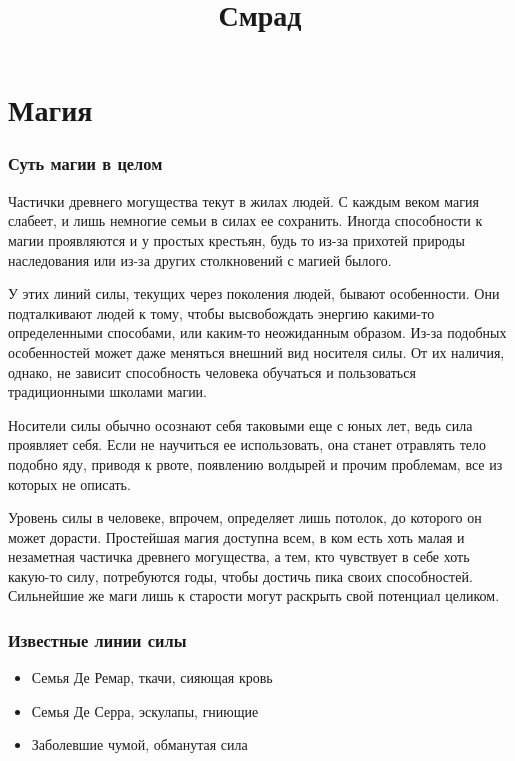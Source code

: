 
\title{Смрад}
\maketitle
\tableofcontents

\part{Магия}
\section{Суть магии в целом}
Частички древнего могущества текут в жилах людей. С каждым веком магия слабеет, и лишь немногие семьи в силах ее сохранить. Иногда
способности к магии проявляются и у простых крестьян, будь то из-за прихотей природы наследования или из-за других столкновений с магией былого.

У этих линий силы, текущих через поколения людей, бывают особенности. Они подталкивают людей к тому, чтобы высвобождать энергию
какими-то определенными способами, или каким-то неожиданным образом. Из-за подобных особенностей может даже меняться внешний вид носителя силы.
От их наличия, однако, не зависит способность человека обучаться и пользоваться традиционными школами магии.

Носители силы обычно осознают себя таковыми еще с юных лет, ведь сила проявляет себя. Если не научиться ее использовать, она станет 
отравлять тело подобно яду, приводя к рвоте, появлению волдырей и прочим проблемам, все из которых не описать.

Уровень силы в человеке, впрочем, определяет лишь потолок, до которого он может дорасти. Простейшая магия доступна всем, в ком 
есть хоть малая и незаметная частичка древнего могущества, а тем, кто чувствует в себе хоть какую-то силу, потребуются годы,
чтобы достичь пика своих способностей. Сильнейшие же маги лишь к старости могут раскрыть свой потенциал целиком.
\section{Известные линии силы}
\begin{itemize}
	\item Семья Де Ремар, ткачи, сияющая кровь
	\item Семья Де Серра, эскулапы, гниющие
	\item Заболевшие чумой, обманутая сила
\end{itemize}


